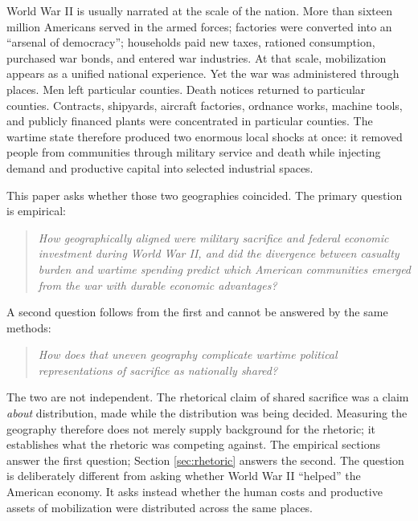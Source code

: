 \documentclass[12pt]{article}
\begin{document}
World War II is usually narrated at the scale of the nation. More than sixteen million Americans served in the armed forces; factories were converted into an ``arsenal of democracy''; households paid new taxes, rationed consumption, purchased war bonds, and entered war industries. At that scale, mobilization appears as a unified national experience. Yet the war was administered through places. Men left particular counties. Death notices returned to particular counties. Contracts, shipyards, aircraft factories, ordnance works, machine tools, and publicly financed plants were concentrated in particular counties. The wartime state therefore produced two enormous local shocks at once: it removed people from communities through military service and death while injecting demand and productive capital into selected industrial spaces.

This paper asks whether those two geographies coincided. The primary question is empirical:

\begin{quote}
\emph{How geographically aligned were military sacrifice and federal economic investment during World War II, and did the divergence between casualty burden and wartime spending predict which American communities emerged from the war with durable economic advantages?}
\end{quote}

\noindent A second question follows from the first and cannot be answered by the same methods:

\begin{quote}
\emph{How does that uneven geography complicate wartime political representations of sacrifice as nationally shared?}
\end{quote}

\noindent The two are not independent. The rhetorical claim of shared sacrifice was a claim \emph{about} distribution, made while the distribution was being decided. Measuring the geography therefore does not merely supply background for the rhetoric; it establishes what the rhetoric was competing against. The empirical sections answer the first question; Section \ref{sec:rhetoric} answers the second. The question is deliberately different from asking whether World War II ``helped'' the American economy. It asks instead whether the human costs and productive assets of mobilization were distributed across the same places.
\end{document}

